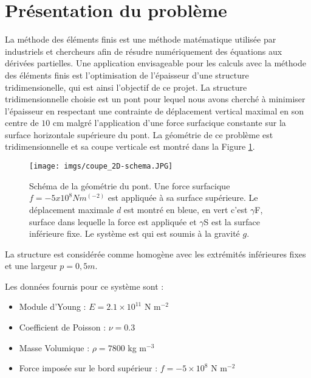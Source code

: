 \documentclass{article}
\begin{document}


    \section{Présentation du problème}
    La méthode des éléments finis est une méthode matématique utilisée par industriels et chercheurs afin de résudre numériquement des équations aux dérivées partielles. Une application envisageable pour les calculs avec la méthode des éléments finis est l'optimisation de l'épaisseur d'une structure tridimensionelle, 
    qui est ainsi l'objectif de ce projet. 
    La structure tridimensionnelle choisie est un pont pour lequel nous avons cherché à minimiser l'épaisseur
    en respectant une contrainte de déplacement vertical maximal en son centre de $10$ cm malgré l'application d'une force surfacique
    constante sur la surface horizontale supérieure du pont. 
    La géométrie de ce problème est tridimensionnelle et sa coupe verticale est montré dans la Figure \ref{fig:schema}.
    \begin{figure}[H]        
    \begin{center}
	
        \texttt{[image: imgs/coupe\_2D-schema.JPG]}
        \caption{Schéma de la géométrie du pont. Une force surfacique $f= - 5x10^8 N m^(-2)$ est appliquée à sa surface supérieure. Le déplacement maximale $d$ est montré en bleue, en vert c'est $\gamma$F, surface dans lequelle la force est appliquée et $\gamma$S est la surface inférieure fixe. Le système est qui est soumis à la gravité $g$.}
        \label{fig:schema}
    
	\end{center}
    \end{figure}
    
    La structure est considérée comme homogène avec les extrémités inférieures fixes et une largeur $p = 0,5 m$. 
    
    Les données fournis pour ce système sont :
    
    \begin{itemize}
    \item Module d'Young : $E = 2.1 \times 10^11$ N m$^{-2}$
    \item Coefficient de Poisson : $\nu = 0.3$ 
    \item Masse Volumique : $\rho = 7800$ kg m$^{-3}$
    \item Force imposée sur le bord supérieur : $f= - 5 \times 10^8$ N m$^{-2}$
    \end{itemize}
    
\end{document}
